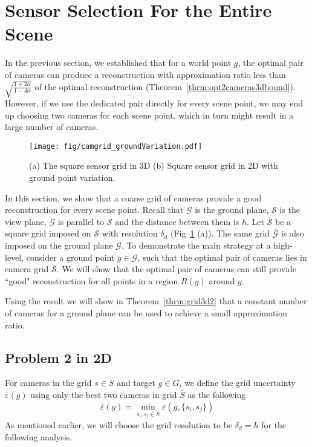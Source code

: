\section{Sensor Selection For the Entire Scene}
In the previous section, we established that for a world point $g$, the optimal pair of cameras can produce a reconstruction with approximation ratio less than $\sqrt{\frac{1+2\alpha}{1-4\alpha}}$ of the optimal reconstruction (Theorem~\ref{thrm:opt2cameras3dbound}).
However, if we use the dedicated pair directly for every scene point, we may end up choosing two cameras for each scene point, which in turn might result in a large number of cameras.
 \begin{figure}[h]
 \centering
 	\texttt{[image: fig/camgrid\_groundVariation.pdf]}
 	\caption{(a) The square sensor grid in 3D (b) Square sensor grid in 2D with ground point variation.}
 	\label{fig:grid}
 \end{figure}
 
In this section, we show that a coarse grid of cameras provide a good reconstruction for every scene point.
Recall that $\mathcal{G}$ is the ground plane, $\mathcal{S}$ is the view plane,   $\mathcal{G}$ is parallel to  $\mathcal{S}$ and the distance between them is $h$. 
Let $\mathcal{\overline{S}}$ be a square grid imposed on $\mathcal{S}$ with resolution $\delta_d$ (Fig~\ref{fig:grid} (a)). The same grid $\mathcal{\overline{G}}$ is also imposed on the ground plane $\mathcal{G}$. 
To demonstrate the main strategy at a high-level, consider a ground point $g \in \mathcal{G}$, such that the optimal pair of cameras lies in camera grid $\mathcal{\overline{S}}$. We will show that the optimal pair of cameras can still provide ``good" reconstruction for all points in a region $R(g)$ around $g$. 

Using the result we will show in Theorem~\ref{thrm:grid3d2} that a constant number of cameras for a ground plane can be used to achieve a small approximation ratio.

\subsection{Problem 2 in 2D}
For cameras in the grid $s \in \overline{S}$ and target $g \in G$, we define the grid uncertainty $\overline{\varepsilon}(g)$ using only the best two cameras in grid $\overline{S}$ as the following
$$
\overline{\varepsilon}(g) = \min_{s_i, s_j \in \overline{S}}\varepsilon(g,\{s_i,s_j\}) 
$$
As mentioned earlier, we will choose the grid resolution to be $\delta_d = h$ for the following analysis.

